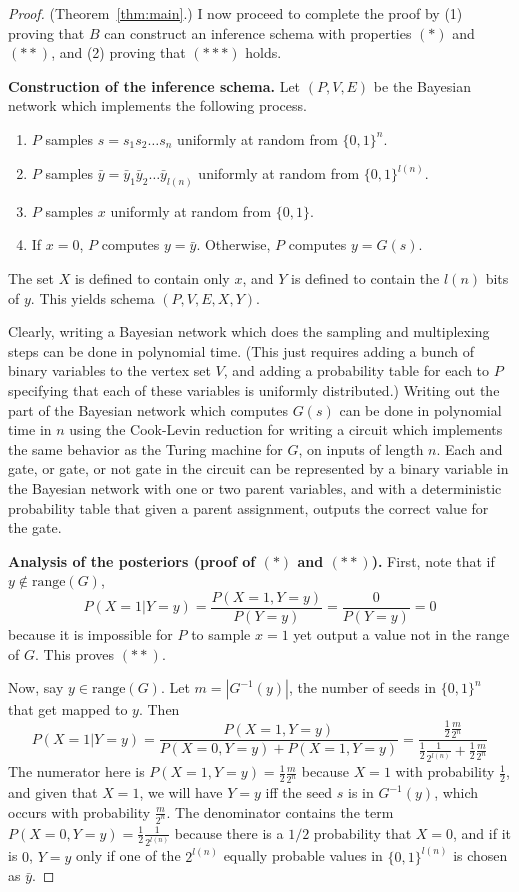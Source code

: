 \documentclass{article}
\theoremstyle{definition}
\theoremstyle{remark}
\begin{document}
\begin{proof}{(Theorem~\ref{thm:main}.)}
I now proceed to complete the proof by (1) proving that $B$ can construct an inference schema with properties $(*)$ and $(**)$, and (2) proving that $(***)$ holds.

\medskip
\noindent \textbf{Construction of the inference schema.}
Let $(P, V, E)$ be the Bayesian network which implements the following process.
\begin{enumerate}
    \item $P$ samples $s = s_1 s_2 \dots s_n$ uniformly at random from $\{0, 1\}^n$.
    \item $P$ samples $\bar{y} = \bar{y}_1 \bar{y}_2 \dots \bar{y}_{l(n)}$ uniformly at random from $\{0, 1\}^{l(n)}$.
    \item $P$ samples $x$ uniformly at random from $\{0, 1\}$.
    \item If $x = 0$, $P$ computes $y = \bar{y}$. Otherwise, $P$ computes $y = G(s)$.
\end{enumerate}
The set $X$ is defined to contain only $x$, and $Y$ is defined to contain the $l(n)$ bits of $y$.  This yields schema $(P, V, E, X, Y)$.

Clearly, writing a Bayesian network which does the sampling and multiplexing steps can be done in polynomial time.
(This just requires adding a bunch of binary variables to the vertex set $V$, and adding a probability table for each to $P$ specifying that each of these variables is uniformly distributed.)
Writing out the part of the Bayesian network which computes $G(s)$ can be done in polynomial time in $n$ using the Cook-Levin reduction for writing a circuit which implements the same behavior as the Turing machine for $G$, on inputs of length $n$.
Each and gate, or gate, or not gate in the circuit can be represented by a binary variable in the Bayesian network with one or two parent variables, and with a deterministic probability table that given a parent assignment, outputs the correct value for the gate.

\medskip
\noindent \textbf{Analysis of the posteriors (proof of $(*)$ and $(**)$).}
First, note that if $y \notin \text{range}(G)$,
$$
P(X = 1 | Y = y) = \frac{P(X = 1, Y = y)}{P(Y = y)} = \frac{0}{P(Y = y)} = 0
$$
because it is impossible for $P$ to sample $x = 1$ yet output a value not in the range of $G$.
This proves $(**)$.

Now, say $y \in \text{range}(G)$.
Let $m = |G^{-1}(y)|$, the number of seeds in $\{0, 1\}^n$ that get mapped to $y$.
Then
$$
P(X = 1 | Y = y) = \frac{P(X = 1, Y = y)}{P(X = 0, Y = y) + P(X = 1, Y = y)}
= \frac{
    \frac{1}{2} \frac{m}{2^n}
}{
    \frac{1}{2} \frac{1}{2^{l(n)}} + \frac{1}{2} \frac{m}{2^n}
}
$$
The numerator here is $P(X = 1, Y = y) = \frac{1}{2} \frac{m}{2^n}$ 
because $X = 1$ with probability $\frac{1}{2}$, and given that $X = 1$, we will have $Y = y$ iff the seed $s$ is in $G^{-1}(y)$, which occurs with probability $\frac{m}{2^n}$.
The denominator contains the term $P(X = 0, Y = y) = \frac{1}{2} \frac{1}{2^{l(n)}}$ because there is a $1/2$ probability that $X = 0$, and if it is $0$, $Y = y$ only if one of the $2^{l(n)}$ equally probable values in $\{0, 1\}^{l(n)}$ is chosen as $\bar{y}$.


\end{proof}
\end{document}
